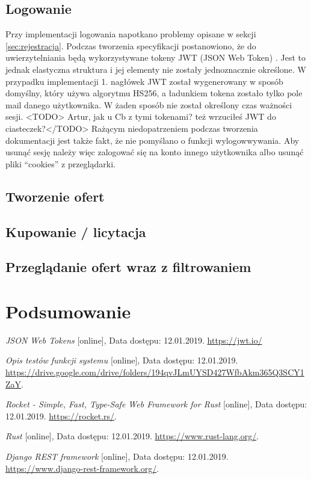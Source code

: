 \documentclass[12pt, notitlepage]{article}
\begin{document}
\subsection{Logowanie}

Przy implementacji logowania napotkano problemy opisane w sekcji \ref{sec:rejestracja}. Podczas tworzenia specyfikacji postanowiono, że do uwierzytelniania będą wykorzystywane tokeny JWT (JSON Web Token) \cite{jwt}. Jest to jednak elastyczna struktura i jej elementy nie zostały jednoznacznie określone. W przypadku implementacji 1. nagłówek JWT został wygenerowany w sposób domyślny, który używa algorytmu HS256, a ładunkiem tokena zostało tylko pole mail danego użytkownika. W żaden sposób nie został określony czas ważności sesji. <TODO> Artur, jak u Cb z tymi tokenami? też wrzuciłeś JWT do ciasteczek?</TODO>
Rażącym niedopatrzeniem podczas tworzenia dokumentacji jest także fakt, że nie pomyślano o funkcji wylogowwywania. Aby usunąć sesję należy więc zalogować się na konto innego użytkownika albo usunąć pliki ``cookies'' z przeglądarki. 

\subsection{Tworzenie ofert}
\subsection{Kupowanie / licytacja}
\subsection{Przeglądanie ofert wraz z filtrowaniem}

\section{Podsumowanie}

\begin{thebibliography}{9}

\textit{JSON Web Tokens} [online], Data dostępu: 12.01.2019. 
\newline\url{https://jwt.io/}

\textit{Opis testów funkcji systemu} [online], Data dostępu: 12.01.2019. 
\newline\url{https://drive.google.com/drive/folders/194qvJLmUYSD427WfbAkm365Q3SCY1ZaY}.

\textit{Rocket - Simple, Fast, Type-Safe Web Framework for Rust} [online], Data dostępu: 12.01.2019. 
\newline\url{https://rocket.rs/}.

\textit{Rust} [online], Data dostępu: 12.01.2019. 
\newline\url{https://www.rust-lang.org/}.

\textit{Django REST framework} [online], Data dostępu: 12.01.2019. 
\newline\url{https://www.django-rest-framework.org/}.

\end{thebibliography} 
\end{document}
